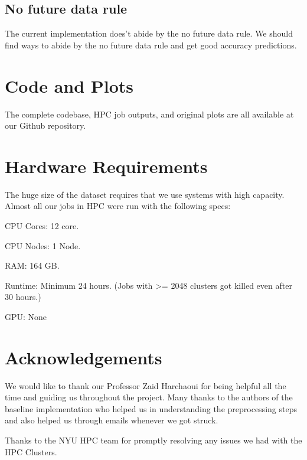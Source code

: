 \documentclass[final,leqno,onefignum,onetabnum]{siamltexmm}
\begin{document}
\subsection{No future data rule}
The current implementation does't abide by the no future data rule.  We should find ways to abide by the no future data rule and get good accuracy predictions.


\section{Code and Plots}
The complete codebase, HPC job outputs, and original plots are all available at our Github repository.\cite{repo:github}

\section{Hardware Requirements}
The huge size of the dataset requires that we use systems with high capacity.  Almost all our jobs in HPC were run with the following specs:
\begin{description}
  \item{CPU Cores:}  12 core.
  \item{CPU Nodes:}  1 Node.
  \item{RAM:}  164 GB\@.
  \item{Runtime:} Minimum 24 hours.  (Jobs with >= 2048 clusters got killed even after 30 hours.)
  \item{GPU:} None
\end{description}

\section{Acknowledgements}
We would like to thank our Professor Zaid Harchaoui for being helpful all the time and guiding us throughout the project. 
Many thanks to the authors of the baseline implementation who helped us in understanding the preprocessing steps and also helped us through emails
whenever we got struck.

Thanks to the NYU HPC team for promptly resolving any issues we had with the HPC Clusters.

\newpage



\end{document}
